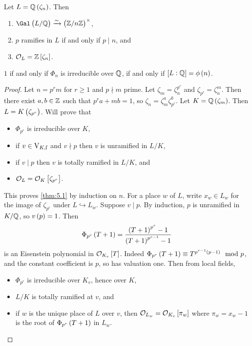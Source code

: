 \begin{theorem}
\label{thm:5.1}
Let $ L = \QQ\br{\zeta_n} $. Then
\begin{enumerate}
\item $ \Gal\br{L / \QQ} \xrightarrow{\sim} \br{\ZZ / n\ZZ}^\times $,
\item $ p $ ramifies in $ L $ if and only if $ p \mid n $, and
\item $ \OOO_L = \ZZ\sbr{\zeta_n} $.
\end{enumerate}
\end{theorem}

\begin{remark*}
$ 1 $ if and only if $ \Phi_n $ is irreducible over $ \mathbb{Q} $, if and only if $ \sbr{L : \QQ} = \phi\br{n} $.
\end{remark*}

\begin{proof}
Let $ n = p^rm $ for $ r \ge 1 $ and $ p \nmid m $ prime. Let $ \zeta_m = \zeta_n^{p^r} $ and $ \zeta_{p^r} = \zeta_n^m $. Then there exist $ a, b \in \mathbb{Z} $ such that $ p^ra + mb = 1 $, so $ \zeta_n = \zeta_m^a\zeta_{p^r}^b $. Let $ K = \QQ\br{\zeta_m} $. Then $ L = K\br{\zeta_{p^r}} $. Will prove that
\begin{itemize}
\item $ \Phi_{p^r} $ is irreducible over $ K $,
\item if $ v \in \mathrm{V}_{K, \mathrm{f}} $ and $ v \nmid p $ then $ v $ is unramified in $ L / K $,
\item if $ v \mid p $ then $ v $ is totally ramified in $ L / K $, and
\item $ \OOO_L = \OOO_K\sbr{\zeta_{p^r}} $.
\end{itemize}
This proves \ref{thm:5.1} by induction on $ n $. For a place $ w $ of $ L $, write $ x_w \in L_w $ for the image of $ \zeta_{p^r} $ under $ L \hookrightarrow L_w $. Suppose $ v \mid p $. By induction, $ p $ is unramified in $ K / \mathbb{Q} $, so $ v\br{p} = 1 $. Then
$$ \Phi_{p^r}\br{T + 1} = \dfrac{\br{T + 1}^{p^r} - 1}{\br{T + 1}^{p^{r - 1}} - 1} $$
is an Eisenstein polynomial in $ \OOO_{K_v}\sbr{T} $. Indeed $ \Phi_{p^r}\br{T + 1} \equiv T^{p^{r - 1}\br{p - 1}} \mod p $, and the constant coefficient is $ p $, so has valuation one. Then from local fields,
\begin{itemize}
\item $ \Phi_{p^r} $ is irreducible over $ K_v $, hence over $ K $,
\item $ L / K $ is totally ramified at $ v $, and
\item if $ w $ is the unique place of $ L $ over $ v $, then $ \OOO_{L_w} = \OOO_{K_v}\sbr{\pi_w} $ where $ \pi_w = x_w - 1 $ is the root of $ \Phi_{p^r}\br{T + 1} $ in $ L_w $.

\end{itemize}
\end{proof}

